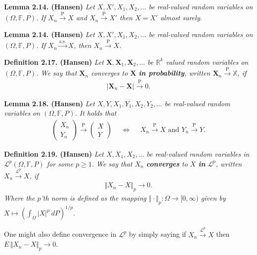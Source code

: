 \documentclass[a4paper,10pt,openany]{book}
\begin{document}
\textbf{Lemma 2.14. (Hansen)} \emph{Let \(X,X',X_1,X_2,...\) be real-valued random variables on \((\Omega,\mathbb{F},P)\). If \(X_n\stackrel{\text{P}}{\to} X\) and \(X_n\stackrel{\text{P}}{\to} X'\) then \(X=X'\) almost surely.}

\textbf{Lemma 2.14. (Hansen)} \emph{Let \(X,X',X_1,X_2,...\) be real-valued random variables on \((\Omega,\mathbb{F},P)\). If \(X_n\stackrel{\text{a.s.}}{\to} X\), then \(X_n\stackrel{\text{P}}{\to} X\).}

\textbf{Definition 2.17. (Hansen)} \emph{Let \(\mathbf{X},\mathbf{X}_1,\mathbf{X}_2,...\) be \(\mathbb{R}^k\) valued random variables on \((\Omega, \mathbb{F},P)\). We say that \(\mathbf{X}_n\) converges to \(\mathbf{X}\) \textbf{in probability}, written \(\mathbf{X}_n\stackrel{\text{P}}{\to} \mathbb{X}\), if}
\begin{align*}
    \vert \mathbf{X}_n-\mathbf{X}\vert \stackrel{\text{P}}{\to} 0.\tag{2.23}
\end{align*}

\textbf{Lemma 2.18. (Hansen)} \emph{Let \(X,Y,X_1,Y_1,X_2,Y_2,...\) be real-valued random variables on \((\Omega,\mathbb{F},P)\). It holds that}
\begin{align*}
    \begin{pmatrix}
    X_n\\Y_n
    \end{pmatrix}\stackrel{\text{P}}{\to} \begin{pmatrix}
    X\\Y
    \end{pmatrix}\hspace{15pt}\iff \hspace{15pt} X_n\stackrel{\text{P}}{\to} X\text{ and }Y_n\stackrel{\text{P}}{\to} Y.\tag{2.24}
\end{align*}

\textbf{Definition 2.19. (Hansen)} \emph{Let \(X,X_1,X_2,...\) be real-valued random variables in \(\mathcal{L}^p(\Omega,\mathbb{F},P)\) for some \(p\ge 1\). We say that \(X_n\) \textbf{converges} to \(X\) \textbf{in} \(\mathcal{L}^p\), written \(X_n\stackrel{\mathcal{L}^p}{\to} X\), if}
\begin{align*}
    \Vert X_n - X\Vert_p\to 0.\tag{2.27}
\end{align*}
\emph{Where the \(p\)'th norm is defined as the mapping \(\Vert \cdot \Vert_p : \Omega\to [0,\infty)\) given by \(X\mapsto \left(\int_\Omega \vert X\vert ^p\ dP\right)^{1/p}\).}

One might also define convergence in \(\mathcal{L}^p\) by simply saying if \(X_n\stackrel{\mathcal{L}^p}{\to} X\) then \(E\,\Vert X_n-X\Vert_p\to 0\).
\end{document}
